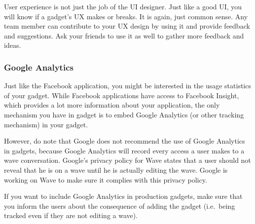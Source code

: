User experience is not just the job of the UI designer. Just like a
good UI, you will know if a gadget's UX makes or breaks. It is again,
just common sense. Any team member can contribute to your UX design by
using it and provide feedback and suggestions. Ask your friends to use
it as well to gather more feedback and ideas.


\subsubsection{Google Analytics}

Just like the Facebook application, you might be interested in the
usage statistics of your gadget. While Facebook applications have
access to Facebook Insight, which provides a lot more information
about your application, the only mechanism you have in gadget is to
embed Google Analytics (or other tracking mechanism) in your
gadget.

However, do note that Google does not recommend the use of Google
Analytics in gadgets, because Google Analytics will record every access
a user makes to a wave conversation.  Google's privacy policy for Wave
states that a user should not reveal that he is on a wave until he is
actually editing the wave. Google is working on Wave to make sure it
complies with this privacy policy.

If you want to include Google Analytics in production gadgets, make
sure that you inform the users about the consequence of adding the
gadget (i.e.\ being tracked even if they are not editing a wave).


% 
% 



